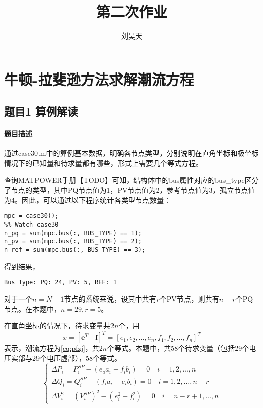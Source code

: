 \documentclass[a4paper,12pt]{article}
\title{第二次作业}
\author{刘昊天}
\newcommand{\vect}[1]{\boldsymbol{#1}}
\begin{document}
    \maketitle
    \section{牛顿-拉斐逊方法求解潮流方程}
    \subsection{题目1 算例解读}
    \paragraph{题目描述} 通过case30.m中的算例基本数据，明确各节点类型，分别说明在直角坐标和极坐标情况下的已知量和待求量都有哪些，形式上需要几个等式方程。

    查询MATPOWER手册【TODO】可知，结构体中的bus属性对应的bus\_type区分了节点的类型，其中PQ节点值为1，PV节点值为2，参考节点值为3，孤立节点值为4。因此，可以通过以下程序统计各类型节点数量：

    \begin{lstlisting}[style=Matlab-editor,basicstyle=\mlttfamily]
mpc = case30();
%% Watch case30
n_pq = sum(mpc.bus(:, BUS_TYPE) == 1);
n_pv = sum(mpc.bus(:, BUS_TYPE) == 2);
n_ref = sum(mpc.bus(:, BUS_TYPE) == 3);
    \end{lstlisting}
    得到结果，
    \begin{lstlisting}
Bus Type: PQ: 24, PV: 5, REF: 1
    \end{lstlisting}

    对于一个$n=N-1$节点的系统来说，设其中共有$r$个PV节点，则共有$n-r$个PQ节点。在本题中，$n=29,r=5$。

    在直角坐标的情况下，待求变量共$2n$个，用
    $$x=[\vect{e}^T \quad \vect{f}]^T=[e_1,e_2,...,e_n,f_1,f_2,...,f_n]^T$$ 表示，潮流方程为\cref{eq:pfzj}，共$2n$个等式。本题中，共58个待求变量（包括29个电压实部与29个电压虚部），58个等式。
    \begin{equation}
      \label{eq:pfzj}
      \begin{cases}
        \Delta P_i = P^{SP}_i-(e_a a_i+ f_i b_i) = 0 \quad i=1,2,...,n\\
        \Delta Q_i = Q^{SP}_i - (f_i a_i - e_i b_i) = 0 \quad i = 1,2,...,n-r\\
        \Delta V_i^2 = (V_i^{SP})^2-(e_i^2+f_i^2)=0 \quad i=n-r+1,...,n
      \end{cases}
    \end{equation}
\end{document}
